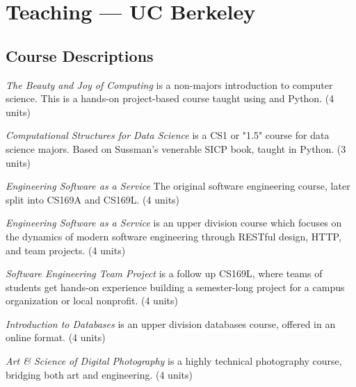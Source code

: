 \section{Teaching — UC Berkeley}

\vspace{6pt}

\subsection{Course Descriptions}

\vspace{5pt}
\begin{description}
    \setlength\itemsep{0.7em}
    \item[CS 10] \textit{The Beauty and Joy of Computing} is a non-majors introduction to computer science. This is a hands-on project-based course taught using \snap and Python.  (4 units) %
    
    \item[CS 88 / DATA C88C] \textit{Computational Structures for Data Science} is a CS1 or "1.5" course for data science majors. Based on Sussman's venerable SICP book, taught in Python. (3 units)

    \item[CS 169] \textit{Engineering Software as a Service} The original software engineering course, later split into CS169A and CS169L. (4 units)
    
    \item[CS169A] \textit{Engineering Software as a Service} is an upper division course which focuses on the dynamics of modern software engineering through RESTful design, HTTP, and team projects. (4 units)
    
    \item[CS169L] \textit{Software Engineering Team Project} is a follow up CS169L, where teams of students get hands-on experience building a semester-long project for a campus organization or local nonprofit.  (4 units)
    
    \item[CS W186] \textit{Introduction to Databases} is an upper division databases course, offered in an online format.  (4 units)
    
    \item[CS 194-23] \textit{Art \& Science of Digital Photography} is a highly technical photography course, bridging both art and engineering. (4 units)
    

\end{description}
